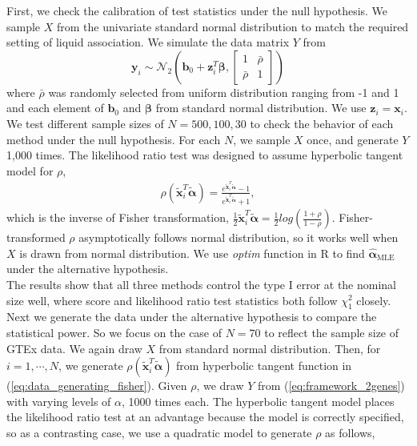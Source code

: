 \documentclass[aoas,authoryear, preprint]{imsart}
\numberwithin{equation}{section}
\theoremstyle{plain}
\begin{document}
First, we check the calibration of test statistics under the null hypothesis. We sample $X$ from the univariate standard normal distribution to match the required setting of liquid association. We simulate the data matrix $Y$ from 
$$\bm{y}_i \sim \mathcal{N}_2\left(\bm{b}_0 + \bm{z}_i^T\bm{\beta}, \begin{bmatrix} 1 & \bar{\rho} \\ \bar{\rho} & 1 \end{bmatrix}  \right)$$ 
where $\bar{\rho}$ was randomly selected from uniform distribution ranging from -1 and 1 and each element of $\bm{b}_0$ and $\bm{\beta}$ from standard normal distribution. We use $\bm{z}_i = \bm{x}_i$. We test different sample sizes of $N = 500, 100, 30$ to check the behavior of each method under the null hypothesis. For each $N$, we sample $X$ once, and generate $Y$ 1,000 times. The likelihood ratio test was designed to assume hyperbolic tangent model for $\rho$,
\begin{align}
    \rho(\bm{\tilde{x}}_i^T\bm{\tilde{\alpha}}) = \frac{e^{\bm{\tilde{x}}_i^T\bm{\tilde{\alpha}}}-1}{e^{\bm{\tilde{x}}_i^T\bm{\tilde{\alpha}}}+1},
    \label{eq:data_generating_fisher}
\end{align}
which is the inverse of Fisher transformation, 
$\frac{1}{2} \bm{\tilde{x}}_i^T\bm{\tilde{\alpha}} = \frac{1}{2}log \left(\frac{1+\rho}{1-\rho}\right)$. Fisher-transformed $\rho$ asymptotically follows normal distribution, so it works well when $X$ is drawn from normal distribution. We use \textit{optim} function in R to find $\hat{\bm{\alpha}}_{\text{MLE}}$ under the alternative hypothesis. \\

The results show that all three methods control the type I error at the nominal size well, where score and likelihood ratio test statistics both follow $\chi_1^2$ closely. \\

Next we generate the data under the alternative hypothesis to compare the statistical power. So we focus on the case of $N=70$ to reflect the sample size of GTEx data. We again draw $X$ from standard normal distribution. Then, for $i = 1, \cdots, N$, we generate $\rho(\bm{\tilde{x}}_i^T\bm{\tilde{\alpha}})$ from hyperbolic tangent function in (\ref{eq:data_generating_fisher}). Given $\rho$, we draw $Y$ from (\ref{eq:framework_2genes}) with varying levels of $\alpha$, 1000 times each. The hyperbolic tangent model places the likelihood ratio test at an advantage because the model is correctly specified, so as a contrasting case, we use a quadratic model to generate $\rho$ as follows,
\end{document}
